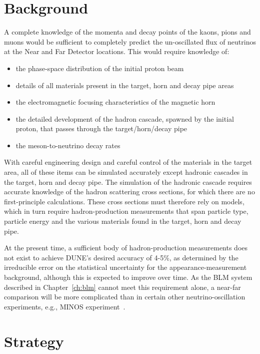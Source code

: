 \section{Background}
A complete knowledge of the momenta and decay points of the kaons, pions and muons would be sufficient to completely predict the un-oscillated flux of neutrinos at the Near and Far Detector
locations. This would require knowledge of:

\begin{itemize}
\item the phase-space distribution of the initial proton beam
\item details of all materials present in the target, horn and decay pipe areas
\item  the electromagnetic focusing characteristics of the magnetic horn
\item the detailed development of the hadron cascade, spawned by the
initial proton, that passes through the target/horn/decay pipe
\item the meson-to-neutrino decay rates
\end{itemize}

With careful engineering design and careful control of the materials in the
target area, all of these items can be simulated accurately except
hadronic cascades in the target, horn and decay
pipe. The simulation of the hadronic cascade requires accurate knowledge of the 
hadron scattering cross sections, for which there are no first-principle
calculations. These cross sections must therefore rely on models, which in
turn require hadron-production measurements that span particle type,
particle energy and the various materials found in the target, horn
and decay pipe. 

 At the present time, a sufficient body of hadron-production
measurements does not exist to achieve DUNE's desired accuracy of 4-5\%, as determined by the irreducible 
error on the statistical uncertainty for the appearance-measurement background, although this is expected to improve over time. 
As the BLM system described in Chapter~\ref{ch:blm} cannot meet this requirement alone, a near-far comparison will be more complicated than in certain other neutrino-oscillation experiments, e.g.,  MINOS experiment~\cite{gnumi-validation}. 

\section{Strategy}

